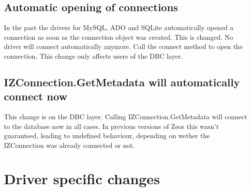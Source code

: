 \documentclass[a4paper,12pt,oneside]{book}
\begin{document}
\subsection{Automatic opening of connections}
\label{Rev4_BreakingChanges_AutomaticOpeningOfConnections}
In the past the drivers for MySQL, ADO and SQLite automatically opened a connection as soon as the connection object was created.
This is changed.
No driver will connect automatically anymore.
Call the connect method to open the connection.
This change only affects users of the DBC layer.

\subsection{IZConnection.GetMetadata will automatically connect now}
\label{Rev4_BreakingChanges_IZConnectionGetMetadataAutoconnect}
This change is on the DBC layer.
Calling IZConnection.GetMetadata will connect to the database now in all cases.
In previous versions of Zeos this wasn't guaranteed, leading to undefined behaviour, depending on wether the IZConnection was already connected or not.

\section{Driver specific changes}
\label{sec:Rev4_DriverSpecificChanges}
\end{document}

